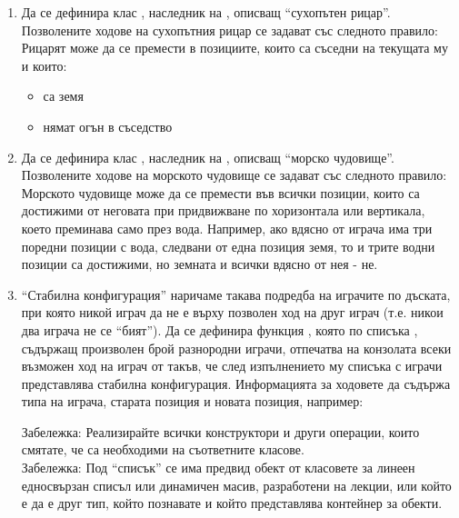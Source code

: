 \begin{enumerate}
\begin{enumerate}[label=\alph*)]
\begin{itemize}
      \end{itemize}

      \item Да се дефинира клас , наследник на , описващ ``сухопътен рицар''. Позволените ходове на сухопътния рицар се задават със следното правило: Рицарят може да се премести в позициите, които са съседни на текущата му и които:
      \begin{itemize}
        \item са земя
        \item нямат огън в съседство
      \end{itemize}

      \item Да се дефинира клас , наследник на , описващ ``морско чудовище''. Позволените ходове на морското чудовище се задават със следното правило: Морското чудовище може да се премести във всички позиции, които са достижими от неговата при придвижване по хоризонтала или вертикала, което преминава само през вода. Например, ако вдясно от играча има три поредни позиции с вода, следвани от една позиция земя, то и трите водни позиции са достижими, но земната и всички вдясно от нея - не.


      \item ``Стабилна конфигурация'' наричаме такава подредба на играчите по дъската, при която никой играч да не е върху позволен ход на друг играч (т.е. никои два играча не се ``бият''). Да се дефинира функция , която по списъка , съдържащ произволен брой разнородни играчи, отпечатва на конзолата всеки възможен ход на играч от  такъв, че след изпълнението му списъка с играчи представлява стабилна конфигурация. Информацията за ходовете да съдържа типа на играча, старата позиция и новата позиция, например:



      \begin{flushleft}
      Забележка: Реализирайте всички конструктори и други операции, които смятате, че са необходими на съответните класове.\\

      Забележка: Под ``списък'' се има предвид обект от класовете за линеен едносвързан списъл или динамичен масив, разработени на лекции, или който е да е друг тип, който познавате и който представлява контейнер за обекти.


\end{flushleft}
\end{enumerate}
\end{enumerate}
